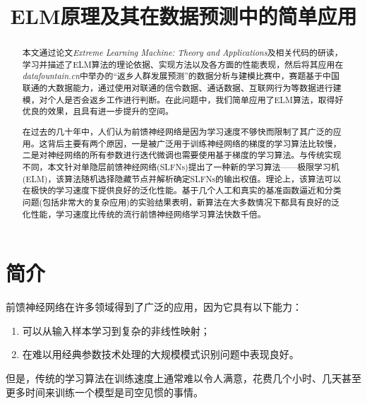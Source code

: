 \documentclass[conference]{IEEEtran}
\begin{document}
\title{ELM原理及其在数据预测中的简单应用}

\author{
}

\maketitle

\begin{abstract}
	本文通过论文\textit{Extreme Learning Machine: Theory and Applications}\cite{elm:huang}及相关代码的研读，学习并描述了ELM算法的理论依据、实现方法以及各方面的性能表现，然后将其应用在\textit{datafountain.cn}中举办的“返乡人群发展预测”的数据分析与建模比赛中，赛题基于中国联通的大数据能力，通过使用对联通的信令数据、通话数据、互联网行为等数据进行建模，对个人是否会返乡工作进行判断。在此问题中，我们简单应用了ELM算法，取得好优良的效果，且具有进一步提升的空间。
	
	在过去的几十年中，人们认为前馈神经网络是因为学习速度不够快而限制了其广泛的应用。这背后主要有两个原因，一是被广泛用于训练神经网络的梯度的学习算法比较慢，二是对神经网络的所有参数进行迭代微调也需要使用基于梯度的学习算法。与传统实现不同，本文针对单隐层前馈神经网络(SLFNs)提出了一种新的学习算法——极限学习机(ELM)，该算法随机选择隐藏节点并解析确定SLFNs的输出权值。理论上，该算法可以在极快的学习速度下提供良好的泛化性能。基于几个人工和真实的基准函数逼近和分类问题(包括非常大的复杂应用)的实验结果表明，新算法在大多数情况下都具有良好的泛化性能，学习速度比传统的流行前馈神经网络学习算法快数千倍。
\end{abstract}


\section{简介}

前馈神经网络在许多领域得到了广泛的应用，因为它具有以下能力：
\begin{enumerate}
	\item 可以从输入样本学习到复杂的非线性映射；
	\item 在难以用经典参数技术处理的大规模模式识别问题中表现良好。
\end{enumerate}

但是，传统的学习算法在训练速度上通常难以令人满意，花费几个小时、几天甚至更多时间来训练一个模型是司空见惯的事情。
\end{document}
